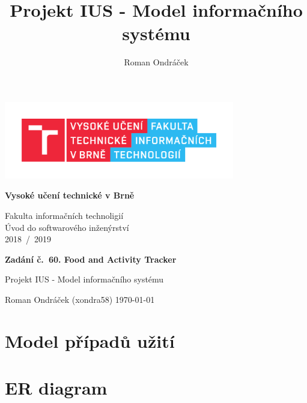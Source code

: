\documentclass[12pt,a4paper]{article}
\author{Roman Ondráček}
\title{Projekt IUS - Model informačního systému}
\begin{document}
\renewcommand{\baselinestretch}{1.5}
\pagestyle{empty}

\begin{center}

\includegraphics[height = 96pt]{img/FIT_barevne_CMYK_CZ.pdf} \\

\begin{LARGE}
\textbf{Vysoké učení technické v Brně} \\
\end{LARGE}

\begin{large}
Fakulta informačních technoligií \\
Úvod do softwarového inženýrství \\
2018~/~2019 \\
\end{large}

\vspace{128pt}

\begin{huge}
\textbf{Zadání č.~60. Food and Activity Tracker} \\
\end{huge}

\begin{large}
Projekt IUS - Model informačního systému \\
\end{large}

\end{center}

\vfill

Roman Ondráček (xondra58) \hfill \today

\newpage

\pagestyle{plain}

\section{Model případů užití}


\newpage

\section{ER diagram}
\end{document}
